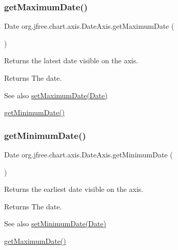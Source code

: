 \subsubsection{\texorpdfstring{get\+Maximum\+Date()}{getMaximumDate()}}
{\footnotesize\ttfamily Date org.\+jfree.\+chart.\+axis.\+Date\+Axis.\+get\+Maximum\+Date (\begin{DoxyParamCaption}{ }\end{DoxyParamCaption})}

Returns the latest date visible on the axis.

\begin{DoxyReturn}{Returns}
The date.
\end{DoxyReturn}
\begin{DoxySeeAlso}{See also}
\mbox{\hyperlink{classorg_1_1jfree_1_1chart_1_1axis_1_1_date_axis_a39b7d4f271f0e436b2ddc59d942d493d}{set\+Maximum\+Date(\+Date)}} 

\mbox{\hyperlink{classorg_1_1jfree_1_1chart_1_1axis_1_1_date_axis_a7749424d09b9dc565b489112aa186672}{get\+Minimum\+Date()}} 
\end{DoxySeeAlso}
\mbox{\label{classorg_1_1jfree_1_1chart_1_1axis_1_1_date_axis_a7749424d09b9dc565b489112aa186672}} 
\subsubsection{\texorpdfstring{get\+Minimum\+Date()}{getMinimumDate()}}
{\footnotesize\ttfamily Date org.\+jfree.\+chart.\+axis.\+Date\+Axis.\+get\+Minimum\+Date (\begin{DoxyParamCaption}{ }\end{DoxyParamCaption})}

Returns the earliest date visible on the axis.

\begin{DoxyReturn}{Returns}
The date.
\end{DoxyReturn}
\begin{DoxySeeAlso}{See also}
\mbox{\hyperlink{classorg_1_1jfree_1_1chart_1_1axis_1_1_date_axis_aef8462c6877d21ffdbc2ae4fa0073469}{set\+Minimum\+Date(\+Date)}} 

\mbox{\hyperlink{classorg_1_1jfree_1_1chart_1_1axis_1_1_date_axis_a7459e23be2ccb30ff4be922caf3d579b}{get\+Maximum\+Date()}} 
\end{DoxySeeAlso}
\mbox{\label{classorg_1_1jfree_1_1chart_1_1axis_1_1_date_axis_a19ad2cfdebcbf7aba66756d01873162d}} 
